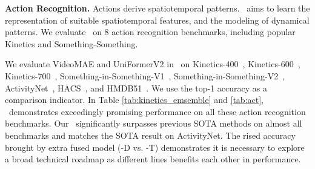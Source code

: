 \textbf{Action Recognition.}
Actions derive spatiotemporal patterns. \model~aims to learn the representation of suitable spatiotemporal features, and the modeling of dynamical patterns. We evaluate \model~on 8 action recognition benchmarks, including popular Kinetics and Something-Something.

We evaluate VideoMAE and UniFormerV2 in \model~on Kinetics-400~\cite{k400}, Kinetics-600~\cite{k600}, Kinetics-700~\cite{k700}, Something-in-Something-V1~\cite{goyal2017something}, Something-in-Something-V2~\cite{goyal2017something}, ActivityNet~\cite{caba2015activitynet}, HACS~\cite{zhao2019hacs}, and
HMDB51~\cite{hmdb51}. We use the top-1 accuracy as a comparison indicator. In Table \ref{tab:kinetics_emsemble} and \ref{tab:act}, \model~demonstrates exceedingly promising performance on all these action recognition benchmarks.
Our \model~significantly surpasses previous SOTA methods on almost all benchmarks and matches the SOTA result on ActivityNet. The rised accuracy brought by extra fused model (\model-D vs. \model-T) demonstrates it is necessary to explore a broad technical roadmap as different lines benefits each other in performance.